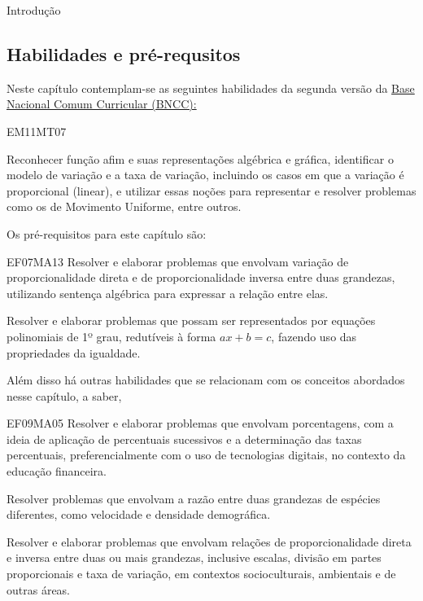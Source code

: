 \begin{apresentacao}{Introdução}

\subsection{Habilidades e pré-requsitos}

Neste capítulo contemplam-se as seguintes habilidades da segunda versão da \href{http://historiadabncc.mec.gov.br/documentos/bncc-2versao.revista.pdf}{Base Nacional Comum Curricular (BNCC):}

\begin{habilities}{EM11MT07}

Reconhecer função afim e suas representações algébrica e gráfica, identificar o modelo de variação e a taxa de variação, incluindo os casos em que a variação é proporcional (linear), e utilizar essas noções para representar e resolver problemas como os de Movimento Uniforme, entre outros.
\end{habilities}

Os pré-requisitos para este capítulo são:

\begin{habilities}{EF07MA13} Resolver e elaborar problemas que envolvam variação de proporcionalidade direta e de proporcionalidade inversa entre duas grandezas, utilizando sentença algébrica para expressar a relação entre elas.

 Resolver e elaborar problemas que possam ser representados por equações polinomiais de 1º grau, redutíveis à forma \(ax+b=c\), fazendo uso das propriedades da igualdade.
\end{habilities}

Além disso há outras habilidades que se relacionam com os conceitos abordados nesse capítulo, a saber,

\begin{habilities}{EF09MA05} Resolver e elaborar problemas que envolvam porcentagens, com a ideia de aplicação de percentuais sucessivos e a determinação das taxas percentuais, preferencialmente com o uso de tecnologias digitais, no contexto da educação financeira.

 Resolver problemas que envolvam a razão entre duas grandezas de espécies diferentes, como velocidade e densidade demográfica.

 Resolver e elaborar problemas que envolvam relações de proporcionalidade direta e inversa entre duas ou mais grandezas, inclusive escalas, divisão em partes proporcionais e taxa de variação, em contextos socioculturais, ambientais e de outras áreas.


\end{habilities}
\end{apresentacao}
